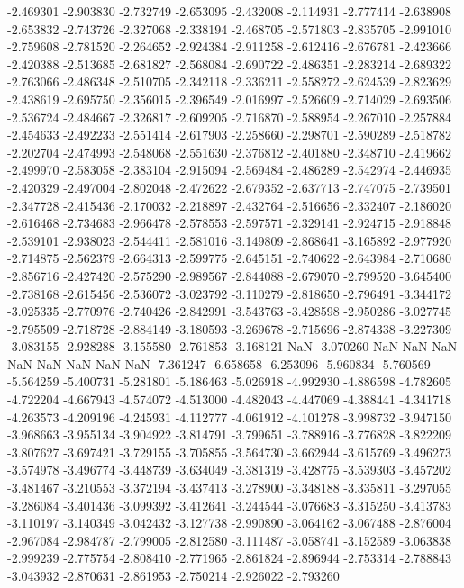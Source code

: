 -2.469301
-2.903830
-2.732749
-2.653095
-2.432008
-2.114931
-2.777414
-2.638908
-2.653832
-2.743726
-2.327068
-2.338194
-2.468705
-2.571803
-2.835705
-2.991010
-2.759608
-2.781520
-2.264652
-2.924384
-2.911258
-2.612416
-2.676781
-2.423666
-2.420388
-2.513685
-2.681827
-2.568084
-2.690722
-2.486351
-2.283214
-2.689322
-2.763066
-2.486348
-2.510705
-2.342118
-2.336211
-2.558272
-2.624539
-2.823629
-2.438619
-2.695750
-2.356015
-2.396549
-2.016997
-2.526609
-2.714029
-2.693506
-2.536724
-2.484667
-2.326817
-2.609205
-2.716870
-2.588954
-2.267010
-2.257884
-2.454633
-2.492233
-2.551414
-2.617903
-2.258660
-2.298701
-2.590289
-2.518782
-2.202704
-2.474993
-2.548068
-2.551630
-2.376812
-2.401880
-2.348710
-2.419662
-2.499970
-2.583058
-2.383104
-2.915094
-2.569484
-2.486289
-2.542974
-2.446935
-2.420329
-2.497004
-2.802048
-2.472622
-2.679352
-2.637713
-2.747075
-2.739501
-2.347728
-2.415436
-2.170032
-2.218897
-2.432764
-2.516656
-2.332407
-2.186020
-2.616468
-2.734683
-2.966478
-2.578553
-2.597571
-2.329141
-2.924715
-2.918848
-2.539101
-2.938023
-2.544411
-2.581016
-3.149809
-2.868641
-3.165892
-2.977920
-2.714875
-2.562379
-2.664313
-2.599775
-2.645151
-2.740622
-2.643984
-2.710680
-2.856716
-2.427420
-2.575290
-2.989567
-2.844088
-2.679070
-2.799520
-3.645400
-2.738168
-2.615456
-2.536072
-3.023792
-3.110279
-2.818650
-2.796491
-3.344172
-3.025335
-2.770976
-2.740426
-2.842991
-3.543763
-3.428598
-2.950286
-3.027745
-2.795509
-2.718728
-2.884149
-3.180593
-3.269678
-2.715696
-2.874338
-3.227309
-3.083155
-2.928288
-3.155580
-2.761853
-3.168121
NaN
-3.070260
NaN
NaN
NaN
NaN
NaN
NaN
NaN
NaN
-7.361247
-6.658658
-6.253096
-5.960834
-5.760569
-5.564259
-5.400731
-5.281801
-5.186463
-5.026918
-4.992930
-4.886598
-4.782605
-4.722204
-4.667943
-4.574072
-4.513000
-4.482043
-4.447069
-4.388441
-4.341718
-4.263573
-4.209196
-4.245931
-4.112777
-4.061912
-4.101278
-3.998732
-3.947150
-3.968663
-3.955134
-3.904922
-3.814791
-3.799651
-3.788916
-3.776828
-3.822209
-3.807627
-3.697421
-3.729155
-3.705855
-3.564730
-3.662944
-3.615769
-3.496273
-3.574978
-3.496774
-3.448739
-3.634049
-3.381319
-3.428775
-3.539303
-3.457202
-3.481467
-3.210553
-3.372194
-3.437413
-3.278900
-3.348188
-3.335811
-3.297055
-3.286084
-3.401436
-3.099392
-3.412641
-3.244544
-3.076683
-3.315250
-3.413783
-3.110197
-3.140349
-3.042432
-3.127738
-2.990890
-3.064162
-3.067488
-2.876004
-2.967084
-2.984787
-2.799005
-2.812580
-3.111487
-3.058741
-3.152589
-3.063838
-2.999239
-2.775754
-2.808410
-2.771965
-2.861824
-2.896944
-2.753314
-2.788843
-3.043932
-2.870631
-2.861953
-2.750214
-2.926022
-2.793260
